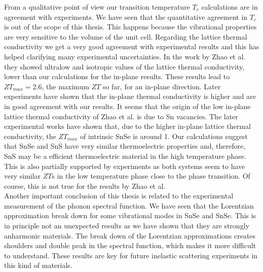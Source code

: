 From a qualitative point of view our transition temperature $T_{c}$ calculations are in agreement with experiments. 
We have seen that the quantitative agreement in $T_{c}$ is out of the scope of this thesis. This happens because the 
vibrational properties are very sensitive to the volume of the unit cell. Regarding the lattice thermal conductivity 
we get a very good agreement with experimental results and this has helped clarifying many experimental 
uncertainties. In the work by Zhao et al.\cite{zhao2014ultralow} they showed ultralow and isotropic values of the 
lattice thermal conductivity, lower than our calculations for the in-plane results. These results lead to 
$ZT_{max}=2.6$, the maximum $ZT$ so far, for an in-plane direction. Later 
experiments\cite{ibrahim2017reinvestigation,wei2019thermoelectric} have shown that the in-plane thermal conductivity 
is higher and are in good agreement with our results. It seems that the origin of the low in-plane lattice thermal 
conductivity of Zhao et al. is due to Sn vacancies. The later experimental works have shown that, due to the higher in-plane lattice thermal conductivity, the $ZT_{max}$ of intrinsic SnSe is around 1. Our calculations suggest that 
SnSe and SnS have very similar thermoelectric properties and, therefore, SnS may be a efficient thermoelectric 
material in the high temperature phase. This is also partially supported by experiments as both systems seem to have 
very similar $ZT$s in the low temperature phase close to the phase transition. Of course, this is not true for the 
results by Zhao et al. \\

Another important conclusion of this thesis is related to the experimental measurement of the phonon spectral 
function. We have seen that the Lorentzian approximation break down for some vibrational modes in SnSe and SnSe. 
This is in principle not an unexpected results as we have shown that they are strongly anharmonic materials. The 
break down of the Lorentzian approximations creates shoulders and double peak in the spectral function, which makes 
it more difficult to understand. These results are key for future inelastic scattering experiments in this kind of 
materials. \\
